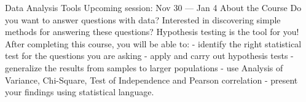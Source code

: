 Data Analysis Tools
Upcoming session: Nov 30 — Jan 4
About the Course
Do you want to answer questions with data? Interested in discovering simple methods for answering these questions? Hypothesis testing is the tool for you! After completing this course, you will be able to: - identify the right statistical test for the questions you are asking - apply and carry out hypothesis tests - generalize the results from samples to larger populations - use Analysis of Variance, Chi-Square, Test of Independence and Pearson correlation - present your findings using statistical language.
